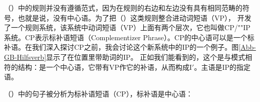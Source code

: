 （）中的规则并没有遵循\xbarc 范式，因为在规则的右边和左边没有具有相同范畴的符号，也就是说，没有中心语。为了把（）这类规则整合进动词短语（VP）， \citet[]{Chomsky86b}开发了一个规则系统，该系统中动词短语（VP）上面有两个层次，它也叫做CP/""IP系统。CP表示标补语短语（Complementizer Phrase）。CP的中心语可以是一个标补语。在我们深入探讨CP之前，我会讨论这个新系统中的IP的一个例子。图\ref{Abb-GB-Hilfsverb}显示了在\inullc 位置里带助词的IP。
正如我们能看到的，这个是与\xbarc 模式相符的结构：\inullc 是一个中心语，它带有VP作它的补语，从而构成I$'$。主语是IP的指定语。
%

（）中的句子被分析为标补语短语（CP），标补语是中心语：

